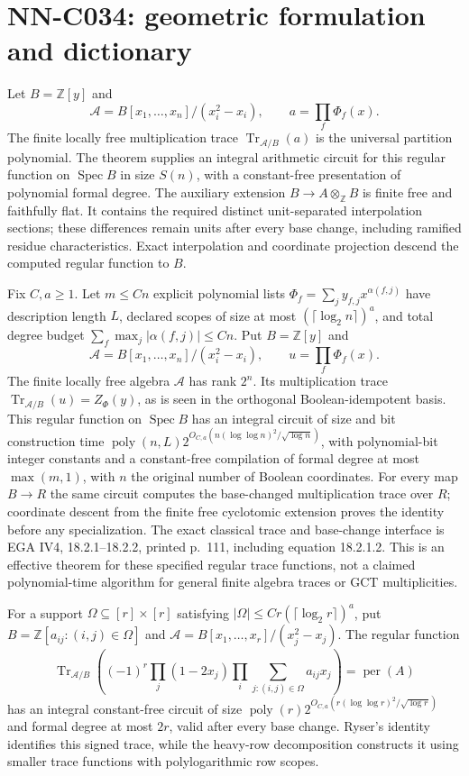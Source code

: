 \section{NN-C034: geometric formulation and dictionary}
\begin{geometricstatement}[NN-C034]
Let $B=\mathbb Z[y]$ and
\[
 \mathscr A=B[x_1,\ldots,x_n]/(x_i^2-x_i),\qquad
                       a=\prod_f\Phi_f(x).
\]
The finite locally free multiplication trace $\operatorname{Tr}_{\mathscr A/B}(a)$ is the universal partition polynomial. The theorem supplies an integral arithmetic circuit for this regular function on $\operatorname{Spec}B$ in size $S(n)$, with a constant-free presentation of polynomial formal degree. The auxiliary extension $B\to A\otimes_{\mathbb Z}B$ is finite free and faithfully flat. It contains the required distinct unit-separated interpolation sections; these differences remain units after every base change, including ramified residue characteristics. Exact interpolation and coordinate projection descend the computed regular function to $B$.

Fix $C,a\ge1$.  Let $m\le Cn$ explicit polynomial lists
$\Phi_f=\sum_j y_{f,j}x^{\alpha(f,j)}$ have description
length $L$, declared scopes of size at most
$(\lceil\log_2n\rceil)^a$, and total degree budget
$\sum_f\max_j|\alpha(f,j)|\le Cn$.  Put $B=\mathbb Z[y]$ and
\[
 \mathscr A=B[x_1,\ldots,x_n]/(x_i^2-x_i),\qquad
                       u=\prod_f\Phi_f(x).
\]
The finite locally free algebra $\mathscr A$ has rank $2^n$.
Its multiplication trace
$\operatorname{Tr}_{\mathscr A/B}(u)=Z_\Phi(y)$, as is
seen in the orthogonal Boolean-idempotent basis.  This
regular function on $\operatorname{Spec}B$ has an integral
circuit of size and bit construction time
$\operatorname{poly}(n,L)2^{O_{C,a}(n(\log\log n)^2/\sqrt{\log n})}$,
with polynomial-bit integer constants and a constant-free
compilation of formal degree at most $\max(m,1)$, with $n$
the original number of Boolean coordinates.  For every map
$B\to R$ the same circuit computes the base-changed
multiplication trace over $R$; coordinate descent from
the finite free cyclotomic extension proves the identity
before any specialization.  The exact classical trace
and base-change interface is EGA IV4, 18.2.1--18.2.2,
printed p.~111, including equation 18.2.1.2.  This is an
effective theorem for these specified regular trace
functions, not a claimed polynomial-time algorithm for
general finite algebra traces or GCT multiplicities.

For a support $\Omega\subseteq[r]\times[r]$ satisfying
$|\Omega|\le Cr(\lceil\log_2r\rceil)^a$, put
$B=\mathbb Z[a_{ij}:(i,j)\in\Omega]$ and
$\mathscr A=B[x_1,\ldots,x_r]/(x_j^2-x_j)$.  The regular
function
\[
 \operatorname{Tr}_{\mathscr A/B}\left(
     (-1)^r\prod_j(1-2x_j)
                 \prod_i\sum_{j:(i,j)\in\Omega}a_{ij}x_j\right)
                              =\operatorname{per}(A)
\]
has an integral constant-free circuit of size
$\operatorname{poly}(r)2^{O_{C,a}(r(\log\log r)^2/\sqrt{\log r})}$
and formal degree at most $2r$, valid after every base
change.  Ryser's identity identifies this signed trace,
while the heavy-row decomposition constructs it using
smaller trace functions with polylogarithmic row scopes.


\end{geometricstatement}
